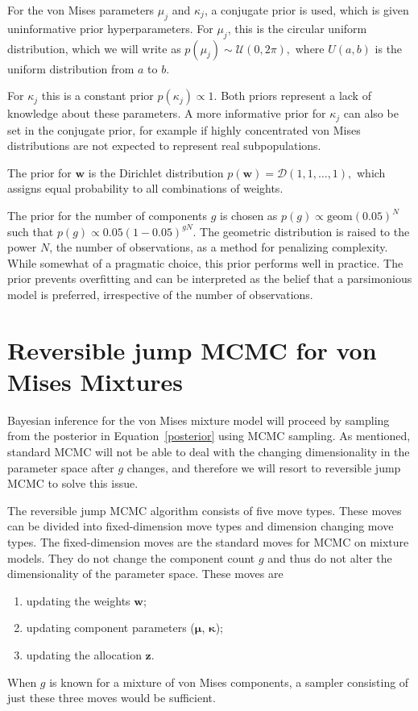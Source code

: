For the von Mises parameters $\mu_j$ and $\kappa_j$, a conjugate prior \citep{mardia1976bayesian, guttorp1988finding} is used, which is given uninformative prior hyperparameters. For $\mu_j$, this is the circular uniform distribution, which we will write as $p(\mu_j) \sim \mathcal{U}(0, 2\pi),$ where $U(a, b)$ is the uniform distribution from $a$ to $b$.

For $\kappa_j$ this is a constant prior $p(\kappa_j) \propto 1$.  Both priors represent a lack of knowledge about these parameters. A more informative prior for $\kappa_j$ can also be set in the conjugate prior, for example if highly concentrated von Mises distributions are not expected to represent real subpopulations.

The prior for $\bm w$ is the Dirichlet distribution $p(\bm w) = \mathcal{D}(1, 1, \dotsc, 1),$ which assigns equal probability to all combinations of weights.

The prior for the number of components $g$ is chosen as $p(g) \propto \text{geom}(0.05)^N$ such that $p(g) \propto 0.05(1-0.05)^{g N}$. The geometric distribution is raised to the power $N$, the number of observations, as a method for penalizing complexity. While somewhat of a pragmatic choice, this prior performs well in practice. The prior prevents overfitting and can be interpreted as the belief that a parsimonious model is preferred, irrespective of the number of observations. 




\section{Reversible jump MCMC for von Mises Mixtures}
\label{implementation}

Bayesian inference for the von Mises mixture model will proceed by sampling from the posterior in Equation~\ref{posterior} using MCMC sampling. As mentioned, standard MCMC will not be able to deal with the changing dimensionality in the parameter space after $g$ changes, and therefore we will resort to reversible jump MCMC to solve this issue. 

The reversible jump MCMC algorithm consists of five move types. These moves can be divided into fixed-dimension move types and dimension changing move types. The fixed-dimension moves are the standard moves for MCMC on mixture models. They do not change the component count $g$ and thus do not alter the dimensionality of the parameter space. These moves are
\begin{enumerate}
	\item updating the weights $\bm w$;
	\item updating component parameters ($\bm \mu$, $\bm \kappa$);
	\item updating the allocation $\bm z$.
	\setcounter{enumTemp}{\theenumi}
\end{enumerate}
When $g$ is known for a mixture of von Mises components, a sampler consisting of just these three moves would be sufficient. 

